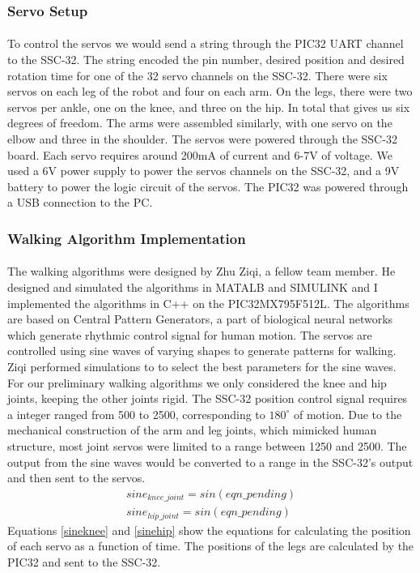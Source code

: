 \documentclass[letterpaper]{article}
\begin{document}
\subsubsection{Servo Setup} 
\paragraph{} To control the servos we would send a string through the PIC32 UART
channel to the SSC-32. The string encoded the pin number, desired position and
desired rotation time for one of the 32 servo channels on the
SSC-32\cite{sscdata}. There were six servos on each leg of the robot and four on
each arm. On the legs, there were two servos per ankle, one on the knee, and
three on the hip. In total that gives us six degrees of freedom.  The arms were
assembled similarly, with one servo on the elbow and three in the shoulder. The
servos were powered through the SSC-32 board. Each servo requires around 200mA
of current and 6-7V of voltage\cite{servodata}. We used a 6V power supply to
power the servos channels on the SSC-32, and a 9V battery to power the logic
circuit of the servos. The PIC32 was powered through a USB connection to the PC.

\subsubsection{Walking Algorithm Implementation} 
\paragraph{} The walking algorithms were designed by Zhu Ziqi, a fellow team
member. He designed and simulated the algorithms in MATALB and SIMULINK and I
implemented the algorithms in C++ on the PIC32MX795F512L. The algorithms are
based on Central Pattern Generators, a part of biological neural networks which
generate rhythmic control signal for human motion\cite{cpggeneral}. The servos
are controlled using sine waves of varying shapes to generate patterns for
walking. Ziqi performed simulations to to select the best parameters for the
sine waves. For our preliminary walking algorithms we only considered the knee
and hip joints, keeping the other joints rigid. The SSC-32 position control
signal requires a integer ranged from 500 to 2500, corresponding to
$180^{\circ}$ of motion\cite{sscdata}. Due to the mechanical construction of the
arm and leg joints, which mimicked human structure, most joint servos were
limited to a range between 1250 and 2500. The output from the sine waves would
be converted to a range in the SSC-32's output and then sent to the servos. 
\begin{align}
    sine_{knee\_joint}=sin(eqn\_pending) \label{sineknee}\\
    sine_{hip\_joint}=sin(eqn\_pending) \label{sinehip}
\end{align}
Equations \ref{sineknee} and \ref{sinehip} show the equations for calculating
the position of each servo as a function of time. The positions of the legs are
calculated by the PIC32 and sent to the SSC-32.
\end{document}
